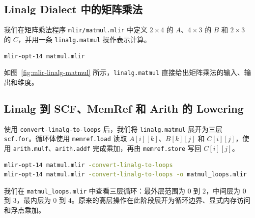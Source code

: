 
\subsection{Linalg Dialect 中的矩阵乘法}

我们在矩阵乘法程序 \texttt{mlir/matmul.mlir} 中定义 $2\times4$ 的 $A$、$4\times3$ 的 $B$ 和 $2\times3$ 的 $C$，并用一条 \texttt{linalg.matmul} 操作表示计算。



\begin{lstlisting}[language=bash]
mlir-opt-14 matmul.mlir
\end{lstlisting}

如图~\ref{fig:mlir-linalg-matmul} 所示，\texttt{linalg.matmul} 直接给出矩阵乘法的输入、输出和维度。


\subsection{Linalg 到 SCF、MemRef 和 Arith 的 Lowering}

使用 \texttt{convert-linalg-to-loops} 后，我们将 \texttt{linalg.matmul} 展开为三层 \texttt{scf.for}。循环体使用 \texttt{memref.load} 读取 $A[i][k]$、$B[k][j]$ 和 $C[i][j]$，使用 \texttt{arith.mulf}、\texttt{arith.addf} 完成乘加，再由 \texttt{memref.store} 写回 $C[i][j]$。

\begin{lstlisting}[language=bash]
mlir-opt-14 matmul.mlir -convert-linalg-to-loops
mlir-opt-14 matmul.mlir -convert-linalg-to-loops -o matmul_loops.mlir
\end{lstlisting}



我们在 \texttt{matmul\_loops.mlir} 中查看三层循环：最外层范围为 $0$ 到 $2$，中间层为 $0$ 到 $3$，最内层为 $0$ 到 $4$。原来的高层操作在此阶段展开为循环边界、显式内存访问和浮点乘加。

